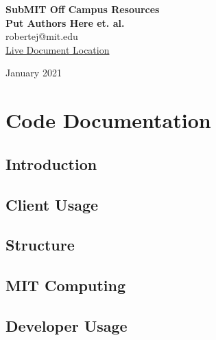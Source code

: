 \documentclass[oneside]{book}
\begin{document}
\begin{titlepage}
\begin{center}
 {\huge\bfseries SubMIT Off Campus Resources\\}
 \vspace{1.5cm}
 {\Large\bfseries Put Authors Here et. al.}\\[5pt]
 robertej@mit.edu\\
 \href{https://latexonline.cc/compile?git=https\%3A\%2F\%2Fgithub.com\%2Frobertej19\%2FSubMITDocs\&target=main.tex\&command=pdflatex\&trackId=1594872205396}{Live Document Location}\\[14pt]
 \vspace{2cm}


 \vfill

 \vfill
{January 2021}
\end{center}
\end{titlepage}

\tableofcontents

\part{Code Documentation}

    \chapter{Introduction}
        
        
    \chapter{Client Usage}
        
    
    \chapter{Structure}
        
        
    \chapter{MIT Computing}
       
        
    \chapter{Developer Usage}
        
    
\end{document}
